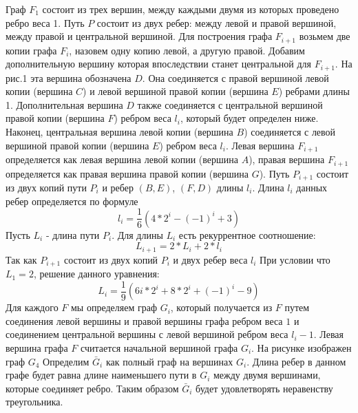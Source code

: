 \documentclass[a4paper, 14pt]{extarticle}
\begin{document}
Граф $F_1$ состоит из трех вершин, между каждыми двумя из которых проведено ребро веса 1. Путь $P$ состоит из двух ребер: между левой и правой вершиной, между правой и центральной вершиной. Для построения графа $F_{i+1}$ возьмем две копии графа $F_i$, назовем одну копию левой, а другую правой. Добавим дополнительную вершину которая впоследствии станет центральной для $F_{i+1}$. На рис.1 эта вершина обозначена $D$. Она соединяется с правой вершиной левой копии (вершина $C$) и левой вершиной правой копии (вершина $E$) ребрами длины 1. Дополнительная вершина $D$ также соединяется с центральной вершиной правой копии (вершина $F$) ребром веса $l_i$, который будет определен ниже. Наконец, центральная вершина левой копии (вершина $B$) соединяется с левой вершиной правой копии (вершина $E$) ребром веса $l_i$. Левая вершина $F_{i+1}$ определяется как левая вершина левой копии (вершина $A$), правая вершина $F_{i+1}$ определяется как правая вершина правой копии (вершина $G$). Путь $P_{i+1}$ состоит из двух копий пути $P_i$ и ребер $(B,E)$, $(F,D)$ длины  $l_i$. Длина $l_i$ данных ребер определяется по формуле
\begin{equation}\label{2.11}
l_i = \frac{1}{6}(4*2^i-(-1)^i+3)
\end{equation}
Пусть $L_i$ - длина пути $P_i$. Для длины $L_i$ есть рекуррентное соотношение:
\begin{equation}
L_{i+1} = 2*L_i+2*l_i
\end{equation}
Так как $P_{i+1}$ состоит из двух копий $P_i$ и двух ребер веса $l_i$ При условии что $L_1=2$, решение данного уравнения: 
\begin{equation}
L_i=\frac{1}{9}(6i*2^i+8*2^i+(-1)^i-9)
\end{equation}
Для каждого $F$ мы определяем граф $G_i$, который получается из $F$ путем соединения левой вершины и правой вершины графа ребром веса $1$ и соединением центральной вершины с левой вершиной ребром веса $l_i-1$. Левая вершина графа $F$ считается начальной вершиной графа $G_i$. На рисунке изображен граф $G_4$ Определим $\bar G_i$ как полный граф на вершинах $G_i$. Длина ребер в данном графе будет равна длине наименьшего пути в $G_i$ между двумя вершинами, которые соединяет ребро. Таким образом $\bar G_i$ будет удовлетворять неравенству треугольника.
\end{document}
